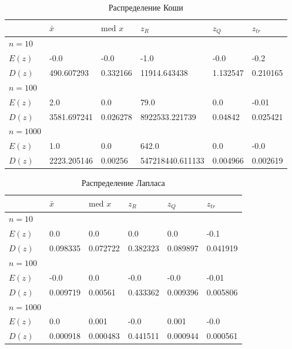 \documentclass[12pt,a4paper]{article}
\begin{document}
\begin{table}[h!]
	\centering
	\begin{tabular}{|l|l|l|l|l|l|}
		\hline&$\bar x$ &$\text{med }x$  &$z_R$  &$z_Q$  &$z_{tr}$  \\ \hline
		$n=10$&&&&& \\ \hline$E(z)$&-0.0&-0.0&-1.0&-0.0&-0.2 \\ \hline$D(z)$&490.607293&0.332166&11914.643438&1.132547&0.210165 \\ \hline
		
		$n=100$&&&&& \\ \hline$E(z)$&2.0&0.0&79.0&0.0&-0.01 \\ \hline$D(z)$&3581.697241&0.026278&8922533.221739&0.04842&0.025421 \\ \hline
		
		$n=1000$&&&&& \\ \hline$E(z)$&1.0&0.0&642.0&0.0&-0.0 \\ \hline$D(z)$&2223.205146&0.00256&547218440.611133&0.004966&0.002619 \\ \hline
	\end{tabular}
	\label{tab:cauchy}
	\caption{Распределение Коши}
\end{table}

\begin{table}[h!]
	\centering
	\begin{tabular}{|l|l|l|l|l|l|}
		\hline&$\bar x$ &$\text{med }x$  &$z_R$  &$z_Q$  &$z_{tr}$  \\ \hline
		$n=10$&&&&& \\ \hline$E(z)$&0.0&0.0&0.0&0.0&-0.1 \\ \hline$D(z)$&0.098335&0.072722&0.382323&0.089897&0.041919 \\ \hline
		
		$n=100$&&&&& \\ \hline$E(z)$&-0.0&0.0&-0.0&-0.0&-0.01 \\ \hline$D(z)$&0.009719&0.00561&0.433362&0.009396&0.005806 \\ \hline
		
		$n=1000$&&&&& \\ \hline$E(z)$&0.0&0.001&-0.0&0.001&-0.0 \\ \hline$D(z)$&0.000918&0.000483&0.441511&0.000944&0.000561 \\ \hline
	\end{tabular}
	\caption{Распределение Лапласа}
\end{table}

\pagebreak
\end{document}
